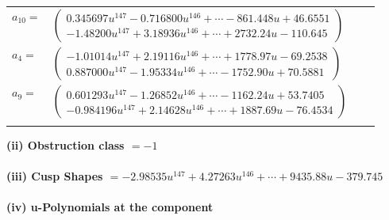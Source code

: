 \documentclass[1p]{elsarticle_modified}
\theoremstyle{definition}
\begin{document}
\begin{tabular}{m{7pt} m{180pt} m{7pt} m{180pt} }
\flushright $a_{10}=$&$\begin{pmatrix}0.345697 u^{147}-0.716800 u^{146}+\cdots-861.448 u+46.6551\\-1.48200 u^{147}+3.18936 u^{146}+\cdots+2732.24 u-110.645\end{pmatrix}$ \\
\flushright $a_{4}=$&$\begin{pmatrix}-1.01014 u^{147}+2.19116 u^{146}+\cdots+1778.97 u-69.2538\\0.887000 u^{147}-1.95334 u^{146}+\cdots-1752.90 u+70.5881\end{pmatrix}$ \\
\flushright $a_{9}=$&$\begin{pmatrix}0.601293 u^{147}-1.26852 u^{146}+\cdots-1162.24 u+53.7405\\-0.984196 u^{147}+2.14628 u^{146}+\cdots+1887.69 u-76.4534\end{pmatrix}$\\&\end{tabular}
\flushleft \textbf{(ii) Obstruction class $= -1$}\\~\\
\flushleft \textbf{(iii) Cusp Shapes $= -2.98535 u^{147}+4.27263 u^{146}+\cdots+9435.88 u-379.745$}\\~\\
\newpage\renewcommand{\arraystretch}{1}
\flushleft \textbf{(iv) u-Polynomials at the component}\newline \\
\end{document}
